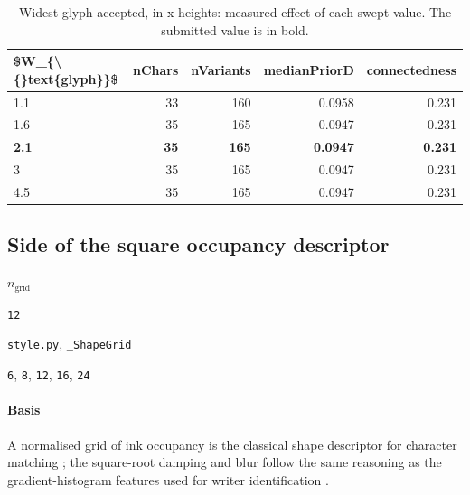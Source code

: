 \begin{table}[htbp]
\centering
\small
\caption{Widest glyph accepted, in x-heights: measured effect of each swept value. The submitted value is in bold.}
\begin{tabular}{lrrrr}
\toprule
\$W\_\{\textbackslash\{\}text\{glyph\}\}\$ & \textsf{nChars} & \textsf{nVariants} & \textsf{medianPriorD} & \textsf{connectedness} \\
\midrule
1.1 & 33 & 160 & 0.0958 & 0.231 \\
1.6 & 35 & 165 & 0.0947 & 0.231 \\
\bfseries 2.1 & \bfseries 35 & \bfseries 165 & \bfseries 0.0947 & \bfseries 0.231 \\
3 & 35 & 165 & 0.0947 & 0.231 \\
4.5 & 35 & 165 & 0.0947 & 0.231 \\
\bottomrule
\end{tabular}
\end{table}

\subsection{Side of the square occupancy descriptor}

\label{coef:shape-grid-n}

\begin{description}[leftmargin=5.2em,style=sameline]

\item[Symbol] $n_{\text{grid}}$

\item[Value] \texttt{12}

\item[Source] \texttt{style.py}, \texttt{\_ShapeGrid}

\item[Swept] \texttt{6}, \texttt{8}, \texttt{12}, \texttt{16}, \texttt{24}

\end{description}

\paragraph{Basis}

A normalised grid of ink occupancy is the classical shape descriptor for character matching \cite{barrow1977,dubuisson1994}; the square-root damping and blur follow the same reasoning as the gradient-histogram features used for writer identification \cite{bulacu2007}.

